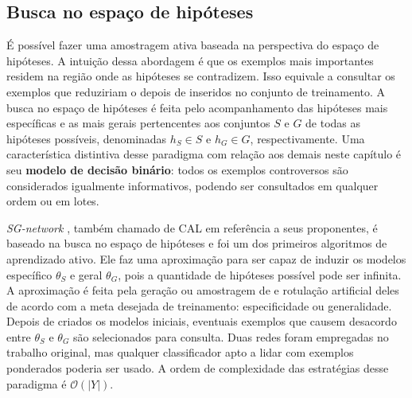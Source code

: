 \subsection{Busca no espaço de hipóteses}\label{sgnet}
É possível fazer uma amostragem ativa baseada na perspectiva do espaço de hipóteses.
A intuição dessa abordagem é que os exemplos mais importantes residem na região onde
as hipóteses se contradizem.
Isso equivale a consultar os exemplos que reduziriam o \versionspace 
\citep{books/daglib/0087929} depois de inseridos no conjunto de treinamento.
A busca no espaço de hipóteses é feita pelo acompanhamento das hipóteses
mais específicas e as mais gerais pertencentes aos conjuntos $S$ e $G$ de todas as hipóteses possíveis,
denominadas $h_S \in S$ e $h_G \in G$, respectivamente.
Uma característica distintiva desse paradigma com relação aos demais neste capítulo é
seu \textbf{modelo de decisão binário}: todos os exemplos controversos são considerados
igualmente informativos,
podendo ser consultados em qualquer ordem ou em lotes.

\textit{SG-network} \cite{journals/ml/CohnAL94},
também chamado de CAL \citep{journals/tcs/Dasgupta11} em referência a seus proponentes,
é baseado na busca no espaço de hipóteses e foi um dos primeiros algoritmos de aprendizado ativo.
Ele faz uma aproximação para ser capaz de induzir os modelos específico
$\theta_S$ e geral $\theta_G$, pois a quantidade de hipóteses possível pode ser infinita.
A aproximação é feita pela geração ou amostragem de 
e rotulação artificial deles de acordo com a meta desejada de treinamento:
especificidade ou generalidade.
Depois de criados os modelos iniciais, eventuais exemplos que causem desacordo entre $\theta_S$ e $\theta_G$
são selecionados para consulta.
Duas redes  \citep{haykin2004comprehensive}
foram empregadas no trabalho original,
mas qualquer classificador apto a lidar com exemplos ponderados poderia ser usado.
A ordem de complexidade das estratégias desse paradigma é $\mathcal{O}(|Y|)$.

